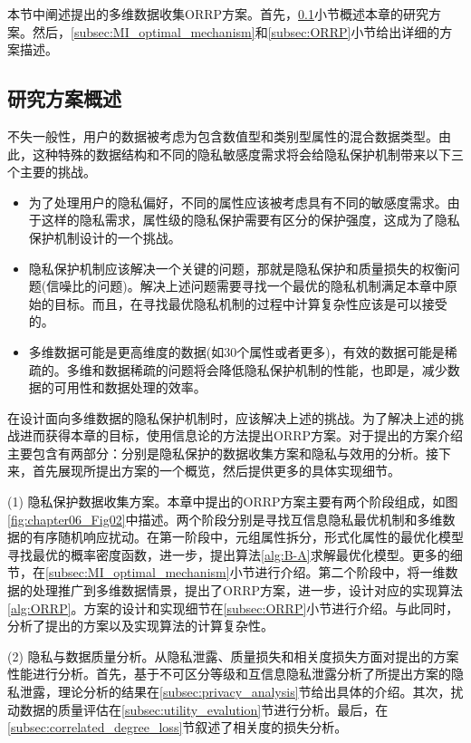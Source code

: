 本节中阐述提出的多维数据收集ORRP方案。首先，\ref{subsec:our_idea}小节概述本章的研究方案。然后，\ref{subsec:MI_optimal_mechanism}和\ref{subsec:ORRP}小节给出详细的方案描述。

 \subsection{研究方案概述}\label{subsec:our_idea}

不失一般性，用户的数据被考虑为包含数值型和类别型属性的混合数据类型。由此，这种特殊的数据结构和不同的隐私敏感度需求将会给隐私保护机制带来以下三个主要的挑战。

\begin{itemize}
\item 为了处理用户的隐私偏好，不同的属性应该被考虑具有不同的敏感度需求。由于这样的隐私需求，属性级的隐私保护需要有区分的保护强度，这成为了隐私保护机制设计的一个挑战。

\item 隐私保护机制应该解决一个关键的问题，那就是隐私保护和质量损失的权衡问题(信噪比的问题\cite{zhang2014privbayes})。解决上述问题需要寻找一个最优的隐私机制满足本章中原始的目标。而且，在寻找最优隐私机制的过程中计算复杂性应该是可以接受的。

\item 多维数据可能是更高维度的数据(如$30$个属性或者更多)，有效的数据可能是稀疏的。多维和数据稀疏的问题将会降低隐私保护机制的性能，也即是，减少数据的可用性和数据处理的效率。
\end{itemize}

在设计面向多维数据的隐私保护机制时，应该解决上述的挑战。为了解决上述的挑战进而获得本章的目标，使用信息论的方法提出ORRP方案。对于提出的方案介绍主要包含有两部分：分别是隐私保护的数据收集方案和隐私与效用的分析。接下来，首先展现所提出方案的一个概览，然后提供更多的具体实现细节。

(1) 隐私保护数据收集方案。本章中提出的ORRP方案主要有两个阶段组成，如图\ref{fig:chapter06_Fig02}中描述。两个阶段分别是寻找互信息隐私最优机制和多维数据的有序随机响应扰动。在第一阶段中，元组属性拆分，形式化属性的最优化模型寻找最优的概率密度函数，进一步，提出算法\ref{alg:B-A}求解最优化模型。更多的细节，在\ref{subsec:MI_optimal_mechanism}小节进行介绍。第二个阶段中，将一维数据的处理推广到多维数据情景，提出了ORRP方案，进一步，设计对应的实现算法\ref{alg:ORRP}。方案的设计和实现细节在\ref{subsec:ORRP}小节进行介绍。与此同时，分析了提出的方案以及实现算法的计算复杂性。

(2) 隐私与数据质量分析。从隐私泄露、质量损失和相关度损失方面对提出的方案性能进行分析。首先，基于不可区分等级和互信息隐私泄露分析了所提出方案的隐私泄露，理论分析的结果在\ref{subsec:privacy_analysis}节给出具体的介绍。其次，扰动数据的质量评估在\ref{subsec:utility_evalution}节进行分析。最后，在\ref{subsec:correlated_degree_loss}节叙述了相关度的损失分析。


